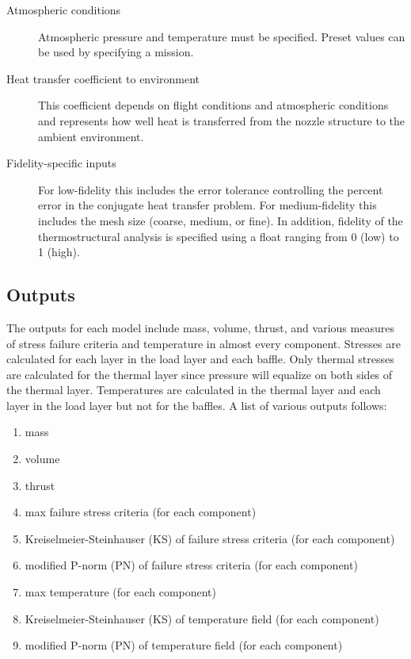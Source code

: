 \documentclass{article}
\begin{document}
\begin{description}
\item[Atmospheric conditions] Atmospheric pressure and temperature must be specified. Preset values can be used by specifying a mission.

\item[Heat transfer coefficient to environment] This coefficient depends on flight conditions and atmospheric conditions and represents how well heat is transferred from the nozzle structure to the ambient environment.

\item[Fidelity-specific inputs] For low-fidelity this includes the error tolerance controlling the percent error in the conjugate heat transfer problem. For medium-fidelity this includes the mesh size (coarse, medium, or fine). In addition, fidelity of the thermostructural analysis is specified using a float ranging from 0 (low) to 1 (high).

\end{description}

\subsection{Outputs}

The outputs for each model include mass, volume, thrust, and various measures of stress failure criteria and temperature in almost every component. Stresses are calculated for each layer in the load layer and each baffle. Only thermal stresses are calculated for the thermal layer since pressure will equalize on both sides of the thermal layer. Temperatures are calculated in the thermal layer and each layer in the load layer but not for the baffles. A list of various outputs follows:

\begin{enumerate}
\item mass
\item volume
\item thrust
\item max failure stress criteria (for each component)
\item Kreiselmeier-Steinhauser (KS) of failure stress criteria (for each component)
\item modified P-norm (PN) of failure stress criteria (for each component)
\item max temperature (for each component)
\item Kreiselmeier-Steinhauser (KS) of temperature field (for each component)
\item modified P-norm (PN) of temperature field (for each component)
\end{enumerate}
\end{document}
